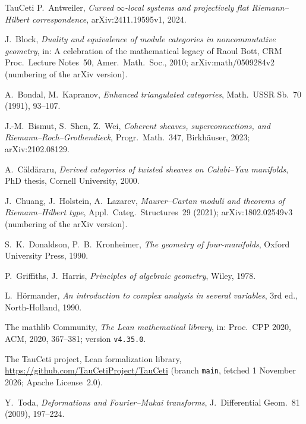 \documentclass[11pt,a4paper]{article}
\newcommand{\code}[1]{\texttt{#1}}
\begin{document}
\begin{thebibliography}{TauCeti}
 P.~Antweiler, \emph{Curved $\infty$-local systems and projectively flat
Riemann--Hilbert correspondence}, arXiv:2411.19595v1, 2024.

 J.~Block, \emph{Duality and equivalence of module categories in noncommutative
geometry}, in: A celebration of the mathematical legacy of Raoul Bott, CRM Proc.\ Lecture
Notes~50, Amer.\ Math.\ Soc., 2010; arXiv:math/0509284v2 (numbering of the arXiv version).

 A.~Bondal, M.~Kapranov, \emph{Enhanced triangulated categories}, Math.\ USSR
Sb.~70 (1991), 93--107.

 J.-M.~Bismut, S.~Shen, Z.~Wei, \emph{Coherent sheaves, superconnections, and
Riemann--Roch--Grothendieck}, Progr.\ Math.~347, Birkhäuser, 2023; arXiv:2102.08129.

 A.~Căldăraru, \emph{Derived categories of twisted sheaves on Calabi--Yau
manifolds}, PhD thesis, Cornell University, 2000.

 J.~Chuang, J.~Holstein, A.~Lazarev, \emph{Maurer--Cartan moduli and theorems
of Riemann--Hilbert type}, Appl.\ Categ.\ Structures~29 (2021); arXiv:1802.02549v3 (numbering of
the arXiv version).

 S.~K.~Donaldson, P.~B.~Kronheimer, \emph{The geometry of four-manifolds}, Oxford
University Press, 1990.

 P.~Griffiths, J.~Harris, \emph{Principles of algebraic geometry}, Wiley, 1978.

 L.~Hörmander, \emph{An introduction to complex analysis in several variables},
3rd ed., North-Holland, 1990.

 The mathlib Community, \emph{The Lean mathematical library}, in: Proc.\
CPP 2020, ACM, 2020, 367--381; version \code{v4.35.0}.

 The TauCeti project, Lean formalization library,
\url{https://github.com/TauCetiProject/TauCeti} (branch \code{main}, fetched 1 November 2026;
Apache License~2.0).

 Y.~Toda, \emph{Deformations and Fourier--Mukai transforms}, J.\ Differential
Geom.~81 (2009), 197--224.
\end{thebibliography}
\end{document}
